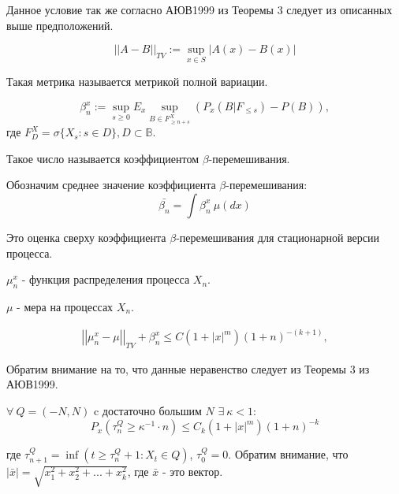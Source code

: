 Данное условие так же согласно АЮВ1999 из Теоремы 3 следует из описанных выше предположений.

\begin{Definition}
$$ 
    \left|\left|A-B\right|\right|_{TV} := \sup_{x \in S} \left|A(x) - B(x)\right|
$$
\end{Definition}
Такая метрика называется метрикой полной вариации.

\begin{Definition}
$$ 
    \beta^x_n := \sup_{s \ge 0}E_x \sup_{B \in F^X_{\ge n + s}}\left(P_x\left(B|F_{\le s}\right) - P\left(B\right)\right),
$$
\setlength{\leftskip}{5em}
\setlength{\rightskip}{5em}
    где $F^X_D = \sigma \{ X_s : s \in D \} , D \subset \mathbb{B}$.
\end{Definition}
Такое число называется коэффициентом $\beta$-перемешивания.

\begin{Designation}
	Обозначим среднее значение коэффициента $\beta$-перемешивания:
$$
    \bar{\beta_n} = \int \beta^x_n \ \mu(dx)
$$
\end{Designation}

Это оценка сверху коэффициента $\beta$-перемешивания для стационарной версии процесса.

\begin{Designation}
    $\mu^x_n$ - функция распределения процесса $X_n$.
\end{Designation}

\begin{Designation}
    $\mu$ - мера на процессах $X_n$.
\end{Designation}

\begin{equation} \label{total_variation_assumption}
    \begin{split}
    \left|\left| \mu^x_n - \mu \right|\right|_{TV} + \beta^x_n \le C(1 + |x|^m)(1 + n)^{-(k + 1)},
    \end{split}
\end{equation}

Обратим внимание на то, что данные неравенство следует из Теоремы 3 из АЮВ1999.

$\forall \ Q=\left(-N, N\right)$ c достаточно большим $N$ $\exists \ \kappa < 1$:
\begin{equation} \label{something}
	P_x\left(\tau^Q_n \ge \kappa^{-1}\cdot n \right) \le C_k \left( 1 +|x|^m \right)\left(1 + n\right)^{-k}
\end{equation}
\begin{flushleft}
	{
	\setlength{\leftskip}{5em}
		\setlength{\rightskip}{5em}
    	где $\tau^Q_{n+1}=\inf \left(t\ge \tau^Q_n +1 : X_t \in Q \right)$, $\tau^Q_0 = 0$. Обратим внимание, что $\left|\bar{x}\right|=\sqrt{x^2_1+x^2_2+...+x^2_k}$, где $\bar{x}$ - это вектор.
    	\\
	}
\end{flushleft}

